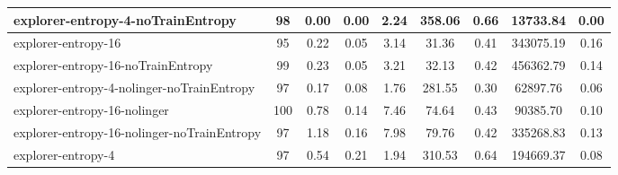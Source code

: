 \begin{sidewaystable}
\begin{longtable}{|l|c|c|c|c|c|c|c|c|}
    
       explorer-entropy-4-noTrainEntropy & 98 & {\cellcolor[HTML]{EBF2F0}} \color[HTML]{000000} 0.00 & {\cellcolor[HTML]{EBF2F0}} \color[HTML]{000000} 0.00 & {\cellcolor[HTML]{C2DFD9}} \color[HTML]{000000} 2.24 & {\cellcolor[HTML]{55AA99}} \color[HTML]{F1F1F1} 358.06 & 0.66 & 13733.84 & {\cellcolor[HTML]{EBF2F0}} \color[HTML]{000000} 0.00 \\ \hline
explorer-entropy-16 & 95 & {\cellcolor[HTML]{E3EFEC}} \color[HTML]{000000} 0.22 & {\cellcolor[HTML]{EBF2F0}} \color[HTML]{000000} 0.05 & {\cellcolor[HTML]{B1D6CF}} \color[HTML]{000000} 3.14 & {\cellcolor[HTML]{DEECE9}} \color[HTML]{000000} 31.36 & 0.41 & 343075.19 & {\cellcolor[HTML]{55AA99}} \color[HTML]{F1F1F1} 0.16 \\ \hline
explorer-entropy-16-noTrainEntropy & 99 & {\cellcolor[HTML]{E2EEEB}} \color[HTML]{000000} 0.23 & {\cellcolor[HTML]{EBF2F0}} \color[HTML]{000000} 0.05 & {\cellcolor[HTML]{B0D6CE}} \color[HTML]{000000} 3.21 & {\cellcolor[HTML]{DEECE9}} \color[HTML]{000000} 32.13 & 0.42 & 456362.79 & {\cellcolor[HTML]{94C8BE}} \color[HTML]{000000} 0.14 \\ \hline
explorer-entropy-4-nolinger-noTrainEntropy & 97 & {\cellcolor[HTML]{E8F1EE}} \color[HTML]{000000} 0.17 & {\cellcolor[HTML]{EBF2F0}} \color[HTML]{000000} 0.08 & {\cellcolor[HTML]{CCE3DE}} \color[HTML]{000000} 1.76 & {\cellcolor[HTML]{75B9AB}} \color[HTML]{000000} 281.55 & 0.30 & 62897.76 & {\cellcolor[HTML]{EBF2F0}} \color[HTML]{000000} 0.06 \\ \hline
explorer-entropy-16-nolinger & 100 & {\cellcolor[HTML]{B6D9D1}} \color[HTML]{000000} 0.78 & {\cellcolor[HTML]{DEECE8}} \color[HTML]{000000} 0.14 & {\cellcolor[HTML]{5EAF9E}} \color[HTML]{F1F1F1} 7.46 & {\cellcolor[HTML]{CCE3DE}} \color[HTML]{000000} 74.64 & 0.43 & 90385.70 & {\cellcolor[HTML]{EBF2F0}} \color[HTML]{000000} 0.10 \\ \hline
explorer-entropy-16-nolinger-noTrainEntropy & 97 & {\cellcolor[HTML]{95C9BE}} \color[HTML]{000000} 1.18 & {\cellcolor[HTML]{C7E1DB}} \color[HTML]{000000} 0.16 & {\cellcolor[HTML]{55AA99}} \color[HTML]{F1F1F1} 7.98 & {\cellcolor[HTML]{CAE2DD}} \color[HTML]{000000} 79.76 & 0.42 & 335268.83 & {\cellcolor[HTML]{D5E8E4}} \color[HTML]{000000} 0.13 \\ \hline
explorer-entropy-4 & 97 & {\cellcolor[HTML]{C9E2DC}} \color[HTML]{000000} 0.54 & {\cellcolor[HTML]{A0CEC4}} \color[HTML]{000000} 0.21 & {\cellcolor[HTML]{C8E2DC}} \color[HTML]{000000} 1.94 & {\cellcolor[HTML]{68B3A4}} \color[HTML]{F1F1F1} 310.53 & 0.64 & 194669.37 & {\cellcolor[HTML]{EBF2F0}} \color[HTML]{000000} 0.08 \\ \hline

\end{longtable}
\end{sidewaystable}
